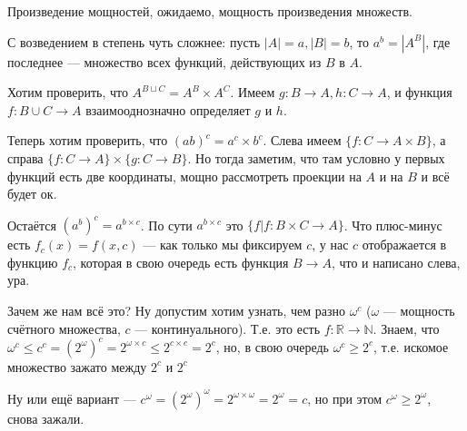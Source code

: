 Произведение мощностей, ожидаемо, мощность произведения множеств.

С возведением в степень чуть сложнее: пусть $|A| = a, |B| = b$, то $a^b = |A^B|$, где последнее --- множество всех функций, действующих из $B$ в $A$.

Хотим проверить, что $A^{B \sqcup C} = A^B \times A^C$. Имеем $g : B \to A, h : C \to A$, и функция $f : B \cup C \to A$ взаимооднозначно определяет $g $ и $h$.

Теперь хотим проверить, что $(ab)^c = a^c \times b^c$. Слева имеем $\{f : C \to A \times B\}$, а справа $\{ f : C \to A  \} \times \{g : C \to B\}$. Но тогда заметим, что там условно у первых функций есть две координаты, мощно рассмотреть проекции  на $A$ и на $B$ и всё будет ок.

Остаётся $(a ^ b)^c = a^{b \times c}$. По сути $a^{b \times c}$ это $\{f | f : B \times C \to A\}$. Что плюс-минус есть $f_c(x) = f(x, c)$ --- как только мы фиксируем $c$, у нас $c$ отображается в функцию $f_c$, которая в свою очередь есть функция $B \to A$, что и написано слева, ура.

Зачем же нам всё это? Ну допустим хотим узнать, чем разно $\omega^c$ ($\omega $ --- мощность счётного множества, $c$ --- континуального). Т.е. это есть $f : \mathbb{R} \to \mathbb{N}$. Знаем, что $\omega^c \le c^c = (2^{\omega})^c = 2^{\omega \times c} \le 2^{c \times c} = 2^{c}$, но, в свою очередь $\omega ^ c \ge 2^c$, т.е. искомое множество зажато между $2^c$ и $2^c$

Ну или ещё вариант --- $c^{\omega} = (2^{\omega})^{\omega} = 2^{\omega \times \omega} = 2^{\omega} = c$, но при этом $c^{\omega} \ge 2^{\omega}$, снова зажали.

